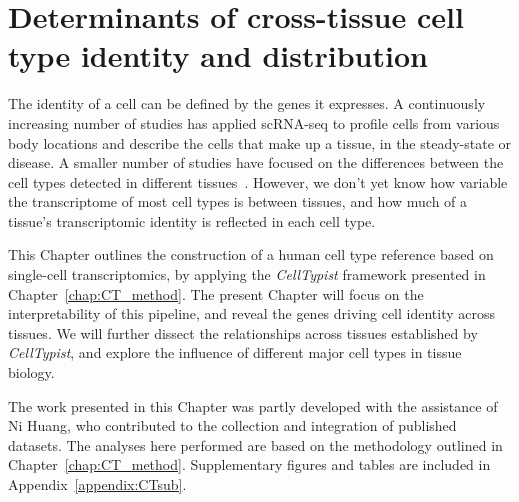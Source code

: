 \chapter{Determinants of cross-tissue cell type identity and distribution} \label{chap:CT_test}

\ifpdf
    \graphicspath{{Chapter4/Figs/Raster/}{Chapter4/Figs/PDF/}{Chapter4/Figs/}}
\else
    \graphicspath{{Chapter4/Figs/Vector/}{Chapter4/Figs/}}
\fi
The identity of a cell can be defined by the genes it expresses. A continuously increasing number of studies has applied scRNA-seq to profile cells from various body locations and describe the cells that make up a tissue, in the steady-state or disease. A smaller number of studies have focused on the differences between the cell types detected in different tissues~\citep{miragaia_single-cell_2019,scott_transcription_2018}. However, we don't yet know how variable the transcriptome of most cell types is between tissues, and how much of a tissue's transcriptomic identity is reflected in each cell type.

This Chapter outlines the construction of a human cell type reference based on single-cell transcriptomics, by applying the \textit{CellTypist} framework presented in Chapter~\ref{chap:CT_method}. The present Chapter will focus on the interpretability of this pipeline, and reveal the genes driving cell identity across tissues. We will further dissect the relationships across tissues established by \textit{CellTypist}, and explore the influence of different major cell types in tissue biology.

The work presented in this Chapter was partly developed with the assistance of Ni Huang, who contributed to the collection and integration of published datasets. The analyses here performed are based on the methodology outlined in Chapter~\ref{chap:CT_method}. Supplementary figures and tables are included in Appendix~\ref{appendix:CTsub}.



